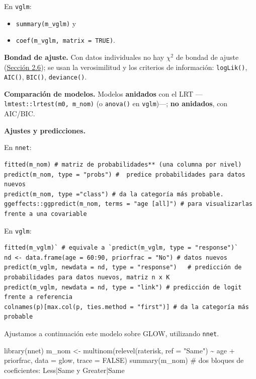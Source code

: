\documentclass[
  letterpaper,
  DIV=11,
  numbers=noendperiod]{scrartcl}
\newenvironment{Shaded}{\begin{snugshade}}{\end{snugshade}}
\newcommand{\AttributeTok}[1]{\textcolor[rgb]{0.40,0.45,0.13}{#1}}
\newcommand{\CommentTok}[1]{\textcolor[rgb]{0.37,0.37,0.37}{#1}}
\newcommand{\ConstantTok}[1]{\textcolor[rgb]{0.56,0.35,0.01}{#1}}
\newcommand{\FunctionTok}[1]{\textcolor[rgb]{0.28,0.35,0.67}{#1}}
\newcommand{\NormalTok}[1]{\textcolor[rgb]{0.00,0.23,0.31}{#1}}
\newcommand{\OtherTok}[1]{\textcolor[rgb]{0.00,0.23,0.31}{#1}}
\newcommand{\SpecialCharTok}[1]{\textcolor[rgb]{0.37,0.37,0.37}{#1}}
\newcommand{\StringTok}[1]{\textcolor[rgb]{0.13,0.47,0.30}{#1}}
\providecommand{\tightlist}{%
  \setlength{\itemsep}{0pt}\setlength{\parskip}{0pt}}\usepackage{longtable,booktabs,array}
\begin{document}
\begin{tcolorbox}
En \texttt{vglm}:

\begin{itemize}
\tightlist
\item
  \texttt{summary(m\_vglm)} y
\item
  \texttt{coef(m\_vglm,\ matrix\ =\ TRUE)}.
\end{itemize}

\textbf{Bondad de ajuste.} Con datos individuales no hay \(\chi^2\) de
bondad de ajuste (\protect\hyperlink{sec-u12-diagnostico}{Sección 2.6});
se usan la verosimilitud y los criterios de información:
\texttt{logLik()}, \texttt{AIC()}, \texttt{BIC()}, \texttt{deviance()}.

\textbf{Comparación de modelos.} Modelos \textbf{anidados} con el LRT
---\texttt{lmtest::lrtest(m0,\ m\_nom)} (o \texttt{anova()} en
\texttt{vglm})---; \textbf{no anidados}, con AIC/BIC.

\textbf{Ajustes y predicciones.}

En \texttt{nnet}:

\begin{verbatim}
fitted(m_nom) # matriz de probabilidades** (una columna por nivel) 
predict(m_nom, type = "probs") #  predice probabilidades para datos nuevos
predict(m_nom, type ="class") # da la categoría más probable. 
ggeffects::ggpredict(m_nom, terms = "age [all]") # para visualizarlas frente a una covariable
\end{verbatim}

En \texttt{vglm}:

\begin{verbatim}
fitted(m_vglm)` # equivale a `predict(m_vglm, type = "response")`
nd <- data.frame(age = 60:90, priorfrac = "No") # datos nuevos
predict(m_vglm, newdata = nd, type = "response")   # predicción de probabilidades para datos nuevos, matriz n x K
predict(m_vglm, newdata = nd, type = "link") # predicción de logit frente a referencia
colnames(p)[max.col(p, ties.method = "first")] # da la categoría más probable
\end{verbatim}

\end{tcolorbox}

Ajustamos a continuación este modelo sobre GLOW, utilizando
\texttt{nnet}.

\begin{Shaded}
\begin{Highlighting}[]
\FunctionTok{library}\NormalTok{(nnet)}
\NormalTok{m\_nom }\OtherTok{\textless{}{-}} \FunctionTok{multinom}\NormalTok{(}\FunctionTok{relevel}\NormalTok{(raterisk, }\AttributeTok{ref =} \StringTok{"Same"}\NormalTok{) }\SpecialCharTok{\textasciitilde{}}\NormalTok{ age }\SpecialCharTok{+}\NormalTok{ priorfrac,}
                  \AttributeTok{data =}\NormalTok{ glow, }\AttributeTok{trace =} \ConstantTok{FALSE}\NormalTok{)}
\FunctionTok{summary}\NormalTok{(m\_nom) }\CommentTok{\# dos bloques de coeficientes: Less|Same y Greater|Same}
\end{Highlighting}
\end{Shaded}
\end{document}
